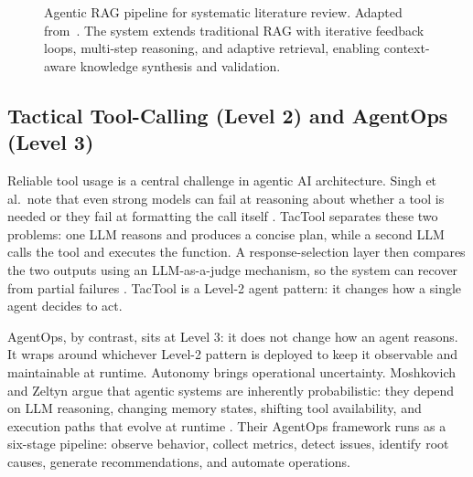 \documentclass[sn-basic,Numbered]{sn-jnl}
\begin{document}
\begin{figure}[ht]
\centering
{}
\caption{Agentic RAG pipeline for systematic literature review. Adapted
from~\cite{singh2025agentrag}. The system extends traditional RAG with
iterative feedback loops, multi-step reasoning, and adaptive retrieval,
enabling context-aware knowledge synthesis and validation.}
\label{fig:agentic_rag}
\end{figure}

\subsection{Tactical Tool-Calling (Level 2) and AgentOps (Level 3)}
\label{sec:tactool}

Reliable tool usage is a central challenge in agentic AI architecture.
Singh et al.\ note that even strong models can fail at
reasoning about whether a tool is needed or they fail at formatting the call
itself \cite{singh2025tactool}. TacTool separates these two problems:
one LLM reasons and produces a concise plan, while a second LLM calls
the tool and executes the function. A response-selection layer then
compares the two outputs using an LLM-as-a-judge mechanism, so the
system can recover from partial failures \cite{singh2025tactool}.
TacTool is a Level-2 agent pattern: it changes how a single agent
decides to act.

AgentOps, by contrast, sits at Level 3: it does not change how an
agent reasons. It wraps around whichever Level-2 pattern is deployed
to keep it observable and maintainable at runtime. Autonomy brings
operational uncertainty. Moshkovich and Zeltyn
argue that agentic systems are inherently probabilistic: they depend
on LLM reasoning, changing memory states, shifting tool availability,
and execution paths that evolve at runtime
\cite{moshkovich2025agentops}. Their AgentOps framework runs as a
six-stage pipeline: observe behavior, collect metrics, detect issues,
identify root causes, generate recommendations, and automate
operations.
\end{document}
